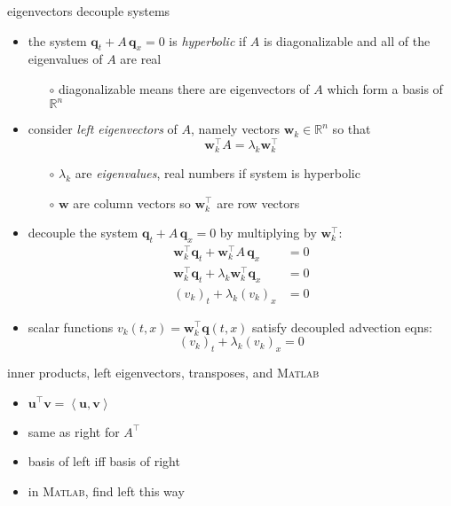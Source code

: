 \documentclass[10pt,hyperref]{beamer}
\newcommand{\bq}{\mathbf{q}}
\newcommand{\bv}{\mathbf{v}}
\newcommand{\bu}{\mathbf{u}}
\newcommand{\bw}{\mathbf{w}}
\newcommand{\RR}{\mathbb{R}}
\newcommand{\Matlab}{\textsc{Matlab}\xspace}
\newcommand{\ip}[2]{\left<#1,#2\right>}
\begin{document}
\begin{frame}{eigenvectors decouple systems}

\begin{itemize}
\item the system $\bq_t + A\, \bq_x=0$ is \emph{hyperbolic} if $A$ is diagonalizable and all of the eigenvalues of $A$ are real
    \begin{itemize}
    \item[$\circ$] diagonalizable means there are eigenvectors of $A$ which form a basis of $\RR^n$
    \end{itemize}
\item consider \emph{left eigenvectors} of $A$, namely vectors $\bw_k \in \RR^n$ so that
    $$\bw_k^\top A = \lambda_k \bw_k^\top$$

\vspace{-2mm}
    \begin{itemize}
    \item[$\circ$] $\lambda_k$ are \emph{eigenvalues}, real numbers if system is hyperbolic
    \item[$\circ$] $\bw$ are column vectors so $\bw_k^\top$ are row vectors
    \end{itemize}
\item decouple the system $\bq_t + A\, \bq_x=0$ by multiplying by $\bw_k^\top$:
\begin{align*}
\bw_k^\top \bq_t + \bw_k^\top A\, \bq_x &= 0 \\
\bw_k^\top \bq_t + \lambda_k \bw_k^\top \bq_x &= 0 \\
(v_k)_t + \lambda_k (v_k)_x &= 0
\end{align*}
\item scalar functions $v_k(t,x) = \bw_k^\top \bq(t,x)$ satisfy decoupled advection eqns:
   $$(v_k)_t + \lambda_k (v_k)_x = 0$$
\end{itemize}
\end{frame}


\begin{frame}{inner products, left eigenvectors, transposes, and \Matlab}

\begin{itemize}
\item $\bu^\top \bv = \ip{\bu}{\bv}$
\item same as right for $A^\top$
\item basis of left iff basis of right
\item in \Matlab, find left this way
\end{itemize}
\end{frame}
\end{document}
